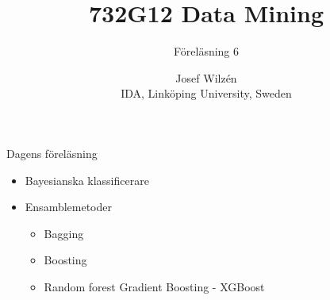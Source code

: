 \documentclass[10pt,english]{beamer}
\title{732G12 Data Mining}
\subtitle{Föreläsning 6}
\date{}
\author{Josef Wilzén \\ IDA, Linköping University, Sweden}
\begin{document}
\maketitle

\begin{frame}{Dagens föreläsning}

    \begin{itemize}
        \item Bayesianska klassificerare
        \item Ensamblemetoder
        \begin{itemize}
            \item Bagging
            \item Boosting
            \item Random forest
            \itemn Gradient Boosting - XGBoost 
        \end{itemize}
    \end{itemize}
    
\end{frame}
\end{document}
